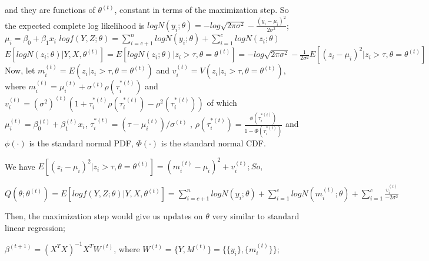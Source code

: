 \documentclass{article}
\begin{document}
and they are functions of $\theta^{(t)}$, constant in terms of the maximization step.  
So the expected complete log likelihood is \newline
$logN(y_i;\theta) = \displaystyle -log\sqrt{2\pi\sigma^2} - \frac{(y_i-\mu_i)^2}{2\sigma^2}$; $\mu_i = \beta_0 + \beta_1x_i$ \newline
$logf(Y,Z;\theta) = \displaystyle \sum_{i=c+1}^n logN(y_i;\theta) + \sum_{i=1}^c logN(z_i;\theta) $ \newline
$E[logN(z_i;\theta) | Y,X,\theta^{(t)}] = E[logN(z_i;\theta) | z_i>\tau,\theta = \theta^{(t)}] 
                        = \displaystyle -log\sqrt{2\pi\sigma^2}-\frac{1}{2\sigma^2}E[(z_i-\mu_i)^2  | z_i>\tau,\theta = \theta^{(t)}]$\newline
Now, let $\displaystyle m_i^{(t)}=E(z_i|z_i>\tau,\theta = \theta^{(t)})$ and $\displaystyle v_i^{(t)}=V(z_i|z_i>\tau,\theta = \theta^{(t)})$, \newline
where $\displaystyle m_i^{(t)} = \mu_i^{(t)} + \sigma^{(t)}\rho(\tau_i^{*(t)})$ 
and $\displaystyle v_i^{(t)} = (\sigma^2)^{(t)}(1 + \tau_i^{*(t)}\rho(\tau_i^{*(t)}) - \rho^2(\tau_i^{*(t)}))$ \newline
of which $\displaystyle \mu_i^{(t)} = \beta_0^{(t)} + \beta_1^{(t)}x_i$, $\displaystyle \tau_i^{*(t)} = (\tau - \mu_i^{(t)})/\sigma^{(t)}$ ,\newline
$\displaystyle \rho(\tau_i^{*(t)}) = \frac{\phi(\tau_i^{*(t)})}{1 - \Phi(\tau_i^{*(t)})}$ 
and $\phi(\cdot)$ is the standard normal PDF, $\Phi(\cdot)$ is the standard normal CDF.\newline 

We have $E[(z_i-\mu_i)^2 | z_i>\tau,\theta = \theta^{(t)}] = (m_i^{(t)}-\mu_i)^2+v_i^{(t)}; So,$\newline

$Q(\theta;\theta^{(t)}) = \displaystyle E[logf(Y,Z;\theta)|Y,X,\theta^{(t)}]
                        = \sum_{i=c+1}^n logN(y_i;\theta) +
                          \sum_{i=1}^c logN(m_i^{(t)};\theta) +
                          \sum_{i=1}^c \frac{v_i^{(t)}}{-2\sigma^2}$ \newline

Then, the maximization step would give us updates on $\theta$ very similar to standard linear regression;\newline

$\beta^{(t+1)} = (X^TX)^{-1}X^TW^{(t)}$, where $W^{(t)}=\{Y, M^{(t)}\}=\{\{y_i\},\{m_i^{(t)}\}\}$; \newline
\end{document}
